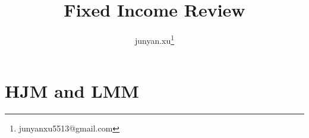 \documentclass[11pt, oneside]{article}   	%
\title{Fixed Income Review}
\author{junyan.xu\footnote{junyanxu5513@gmail.com}}
\begin{document}
\maketitle
\tableofcontents
\newpage


\section{HJM and LMM}
\end{document}
